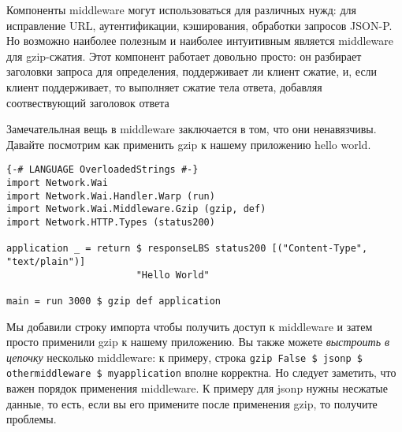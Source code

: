 Компоненты middleware могут использоваться для различных нужд: для исправление URL,
аутентификации, кэширования, обработки запросов JSON-P. Но возможно наиболее полезным
и наиболее интуитивным является middleware для gzip-сжатия. Этот компонент работает
довольно просто: он разбирает заголовки запроса для определения, поддерживает ли клиент
сжатие, и, если клиент поддерживает, то выполняет сжатие тела ответа, добавляя соотвествующий
заголовок ответа

Замечательлная вещь в middleware заключается в том, что они ненавязчивы. Давайте посмотрим
как применить gzip к нашему приложению hello world.

\begin{lstlisting}
{-# LANGUAGE OverloadedStrings #-}
import Network.Wai
import Network.Wai.Handler.Warp (run)
import Network.Wai.Middleware.Gzip (gzip, def)
import Network.HTTP.Types (status200)

application _ = return $ responseLBS status200 [("Content-Type", "text/plain")]
                       "Hello World"

main = run 3000 $ gzip def application
\end{lstlisting}%

Мы добавили строку импорта чтобы получить доступ к middleware и затем просто применили gzip
к нашему приложению. Вы также можете \emph{выстроить в цепочку} несколько middleware:
к примеру, строка \lstinline{gzip False $ jsonp $ othermiddleware $ myapplication}
вполне корректна. Но следует заметить, что важен порядок применения middleware. К примеру
для jsonp нужны несжатые данные, то есть, если вы его примените после применения gzip,
то получите проблемы.

